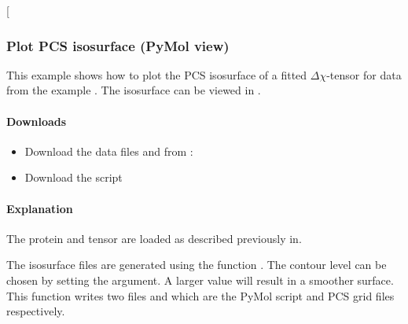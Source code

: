 \documentclass[a4paper,10pt,english,openany,oneside]{sphinxmanual}
\begin{document}
 {[}\sphinxcode{\sphinxupquote{pcs\_fit.png}}{]}

\noindent{}


\subsubsection{Plot PCS isosurface (PyMol view)}
\label{\detokenize{examples/pcs_plot_isosurface:plot-pcs-isosurface-pymol-view}}\label{\detokenize{examples/pcs_plot_isosurface:pcs-plot-isosurface}}\label{\detokenize{examples/pcs_plot_isosurface::doc}}
This example shows how to plot the PCS isosurface of a fitted \({\Delta\chi}\)-tensor for data from the example {\hyperref[\detokenize{examples/pcs_fit:pcs-fit}]{}}. The isosurface can be viewed in .


\paragraph{Downloads}
\label{\detokenize{examples/pcs_plot_isosurface:downloads}}\begin{itemize}
\item {} 
Download the data files  and  from :

\item {} 
Download the script 

\end{itemize}


\paragraph{Explanation}
\label{\detokenize{examples/pcs_plot_isosurface:explanation}}
The protein and tensor are loaded as described previously in.

The isosurface files are generated using the function {\hyperref[\detokenize{reference/generated/paramagpy.metal.Metal.isomap:paramagpy.metal.Metal.isomap}]{}}. The contour level can be chosen by setting the  argument. A larger  value will result in a smoother surface. This function writes two files  and  which are the PyMol script and PCS grid files respectively.
\end{document}
